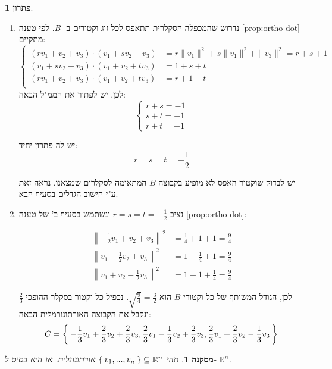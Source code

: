\documentclass[12pt]{report}
\theoremstyle{plain}
\newtheorem{corollary}[theorem]{מסקנה}
\theoremstyle{definition}
\newtheorem*{solution}{פתרון}
\newcommand{\R}{\mathbb{R}}
\newcommand{\0}{\mathbf{0}}
\begin{document}
\begin{solution}\
\begin{enumerate}[label=\alph*.]
\item
נדרוש שהמכפלה הסקלרית תתאפס לכל זוג וקטורים ב-
$B$.
לפי טענה
\ref{prop:ortho-dot}
מתקיים:
$$
\begin{cases}
(rv_1+v_2+v_3)\cdot(v_1+sv_2+v_3)&=r\|v_1\|^2+s\|v_1\|^2+\|v_3\|^2=r+s+1 \\
(v_1+sv_2+v_3)\cdot(v_1+v_2+tv_3)&=1+s+t \\
(rv_1+v_2+v_3)\cdot(v_1+v_2+tv_3)&=r+1+t\\
\end{cases}
$$
לכן, יש לפתור את הממ"ל הבאה:
$$
\begin{cases}
r+s=-1 \\
s+t=-1 \\
r+t=-1 
\end{cases}
$$

יש לה פתרון יחיד:
$$
r=s=t=-\frac{1}{2}
$$

יש לבדוק שוקטור האפס לא מופיע בקבוצה
$B$
המתאימה לסקלרים שמצאנו. נראה זאת ע"י חישוב הגדלים בסעיף הבא.


\item 
נציב
$r=s=t=-\frac{1}{2}$
ונשתמש בסעיף ב' של טענה
\ref{prop:ortho-dot}:

$$
\begin{aligned}
\left\|-\frac{1}{2}v_1+v_2+v_3\right\|^2&=\frac{1}{4}+1+1=\frac{9}{4} \\
\left\|v_1-\frac{1}{2}v_2+v_3\right\|^2&=1+\frac{1}{4}+1=\frac{9}{4} \\
\left\|v_1+v_2-\frac{1}{2}v_3\right\|^2&=1+1+\frac{1}{4}=\frac{9}{4}
\end{aligned}
$$

לכן, הגודל המשותף של כל וקטורי 
$B$
הוא
$\sqrt{\frac{9}{4}}=\frac{3}{2}$.
נכפיל כל וקטור בסקלר ההופכי 
$\frac{2}{3}$
ונקבל את הקבוצה האורתונורמלית הבאה:
$$
C=\Set{-\frac{1}{3}v_1+\frac{2}{3}v_2+\frac{2}{3}v_3,\frac{2}{3}v_1-\frac{1}{3}v_2+\frac{2}{3}v_3,\frac{2}{3}v_1+\frac{2}{3}v_2-\frac{1}{3}v_3}
$$


\end{enumerate}
\end{solution}

\begin{corollary}\label{cor:orthogonal-basis}
תהי
$\Set{v_1,...,v_n}\subseteq\R^n$
אורתוגונלית. אז היא בסיס ל-
$\R^n$.
\end{corollary}
\end{document}
